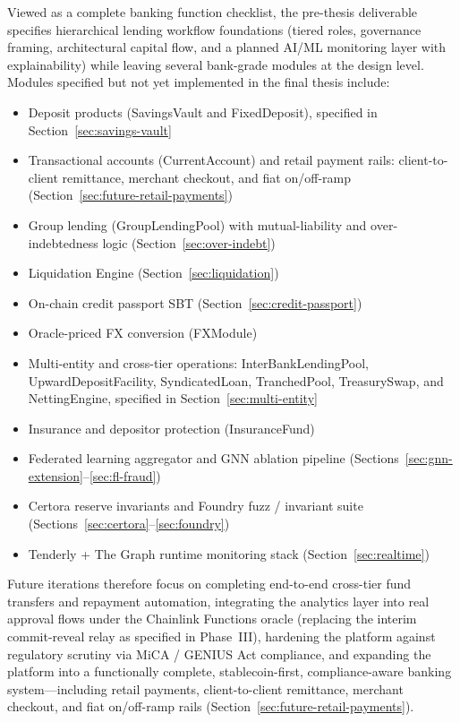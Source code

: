 \documentclass[12pt,a4paper]{report}
\begin{document}
Viewed as a complete banking function checklist, the pre-thesis deliverable specifies hierarchical lending workflow foundations (tiered roles, governance framing, architectural capital flow, and a planned AI/ML monitoring layer with explainability) while leaving several bank-grade modules at the design level. Modules specified but not yet implemented in the final thesis include:
\begin{itemize}[noitemsep]
\item Deposit products (SavingsVault and FixedDeposit), specified in Section~\ref{sec:savings-vault}
\item Transactional accounts (CurrentAccount) and retail payment rails: client-to-client remittance, merchant checkout, and fiat on/off-ramp (Section~\ref{sec:future-retail-payments})
\item Group lending (GroupLendingPool) with mutual-liability and over-indebtedness logic (Section~\ref{sec:over-indebt})
\item Liquidation Engine (Section~\ref{sec:liquidation})
\item On-chain credit passport SBT (Section~\ref{sec:credit-passport})
\item Oracle-priced FX conversion (FXModule)
\item Multi-entity and cross-tier operations: InterBankLendingPool, UpwardDepositFacility, SyndicatedLoan, TranchedPool, TreasurySwap, and NettingEngine, specified in Section~\ref{sec:multi-entity}
\item Insurance and depositor protection (InsuranceFund)
\item Federated learning aggregator and GNN ablation pipeline (Sections~\ref{sec:gnn-extension}--\ref{sec:fl-fraud})
\item Certora reserve invariants and Foundry fuzz / invariant suite (Sections~\ref{sec:certora}--\ref{sec:foundry})
\item Tenderly + The Graph runtime monitoring stack (Section~\ref{sec:realtime})
\end{itemize}
Future iterations therefore focus on completing end-to-end cross-tier fund transfers and repayment automation, integrating the analytics layer into real approval flows under the Chainlink Functions oracle (replacing the interim commit-reveal relay as specified in Phase~III), hardening the platform against regulatory scrutiny via MiCA / GENIUS Act compliance, and expanding the platform into a functionally complete, stablecoin-first, compliance-aware banking system---including retail payments, client-to-client remittance, merchant checkout, and fiat on/off-ramp rails (Section~\ref{sec:future-retail-payments}).
\end{document}
